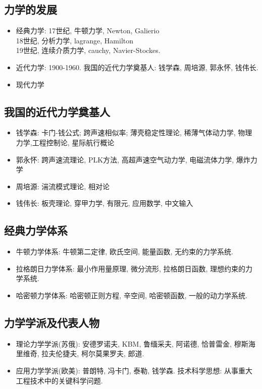 \documentclass[a4paper,titlepage,twocolumn]{article}
\begin{document}
\subsection{力学的发展}
\begin{itemize}
\item     经典力学:  17世纪, 牛顿力学\hphantom{力学}, Newton, Galierio\\
\hphantom{经典力学: }18世纪, 分析力学\hphantom{力学}, lagrange, Hamilton\\
\hphantom{经典力学: }19世纪, 连续介质力学, cauchy, Navier-Stockes.
\item 近代力学: 1900-1960. 我国的近代力学奠基人: 钱学森, 周培源, 郭永怀, 钱伟长.
\item 现代力学
\end{itemize}

\subsection{我国的近代力学奠基人}
\begin{itemize}
\item 钱学森: 卡门-钱公式; 跨声速相似率; 薄壳稳定性理论, 稀薄气体动力学, 物理力学,工程控制论, 星际航行概论
\item 郭永怀: 跨声速流理论, PLK方法, 高超声速空气动力学, 电磁流体力学, 爆炸力学
\item 周培源: 湍流模式理论, 相对论
\item 钱伟长: 板壳理论, 穿甲力学, 有限元, 应用数学, 中文输入
\end{itemize}

\subsection{经典力学体系}
\begin{itemize}
\item 牛顿力学体系: 牛顿第二定律, 欧氏空间, 能量函数, 无约束的力学系统.
\item 拉格朗日力学体系: 最小作用量原理, 微分流形, 拉格朗日函数, 理想约束的力学系统.
\item 哈密顿力学体系: 哈密顿正则方程, 辛空间, 哈密顿函数, 一般的动力学系统.
\end{itemize}

\subsection{力学学派及代表人物}
\begin{itemize}
\item 理论力学学派(苏俄): 安德罗诺夫, KBM, 鲁缅采夫, 阿诺德, 恰普雷金, 穆斯海里维奇, 拉夫伦捷夫, 柯尔莫果罗夫, 郎道.
\item 应用力学学派(欧美): 普朗特, 冯卡门, 泰勒, 钱学森. 技术科学思想: 从事重大工程技术中的关键科学问题.
\end{itemize}
\end{document}
